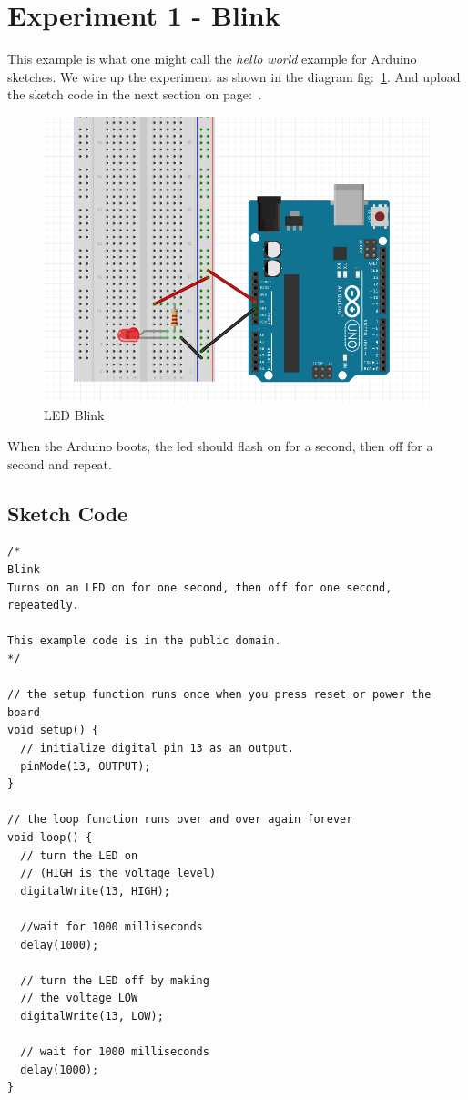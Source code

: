 \chapter*{Experiment 1 - Blink}
This example is what one might call the \textit{hello world} example for \gls{Arduino} sketches. We wire up the experiment as shown in the diagram fig:~\ref{fig:exp1_blink}. And upload the sketch code in the next section on page:~\pageref{sketch:exp1}.

%
\begin{figure}[ht]
	\centering
	\includegraphics[width=12cm]{images/07}
	\caption{LED Blink \citep{fritzing-15}}
	\label{fig:exp1_blink}
\end{figure}
%

When the Arduino boots, the led should flash on for a second, then off for a second and repeat.

\newpage
\section*{Sketch Code}
\label{sketch:exp1}
\begin{lstlisting}
/*
Blink
Turns on an LED on for one second, then off for one second, repeatedly.

This example code is in the public domain.
*/

// the setup function runs once when you press reset or power the board
void setup() {
  // initialize digital pin 13 as an output.
  pinMode(13, OUTPUT);
}

// the loop function runs over and over again forever
void loop() {
  // turn the LED on 
  // (HIGH is the voltage level)
  digitalWrite(13, HIGH);
	
  //wait for 1000 milliseconds
  delay(1000);
	
  // turn the LED off by making 
  // the voltage LOW
  digitalWrite(13, LOW);    
	            
  // wait for 1000 milliseconds              
  delay(1000);
}
\end{lstlisting}